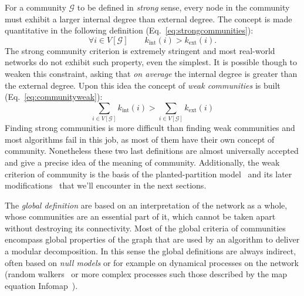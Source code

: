 For a community $\mathcal{G}$ to be defined in \emph{strong} sense, every node in the community must exhibit a larger internal degree than external degree. The concept is made quantitative in the following definition (Eq.~\ref{eq:strongcommunities}):
\begin{equation}\label{eq:strongcommunities}
\forall i \in V[ \mathcal{G} ] \qquad k_{\textrm{int}}(i) > k_{\textrm{ext}}(i).
\end{equation}
The strong community criterion is extremely stringent and most real-world networks do not exhibit such property, even the simplest.
It is possible though to weaken this constraint, asking that \emph{on average} the internal degree is greater than the external degree.  Upon this idea the concept of \emph{weak communities} is built (Eq.~\ref{eq:communityweak}):
\begin{equation}\label{eq:communityweak}
\sum \limits_{i \in V[\mathcal{G}]} k_{\textrm{int}}(i) > \sum \limits_{i \in V[\mathcal{G}]} k_{\textrm{ext}}(i)
\end{equation}
Finding strong communities is more difficult than finding weak communities and most algorithms fail in this job, as most of them have their own concept of community. Nonetheless these two last definitions are almost universally accepted and give a precise idea of the meaning of community. Additionally, the weak criterion of community is the basis of the planted-partition model~\cite{condon2000} and its later modifications~\cite{lancichinetti2008} that we'll encounter in the next sections. 

The \emph{global definition} are based on an interpretation of the network as a whole, whose communities are an essential part of it, which cannot be taken apart without destroying its connectivity. Most of the global criteria of communities encompass global properties of the graph that are used by an algorithm to deliver a modular decomposition. In this sense the global definitions are always indirect, often based on \emph{null models} or for example on dynamical processes on the network (random walkers~\cite{pons2006} or more complex processes such those described by the map equation Infomap~\cite{rosvall2008}).

